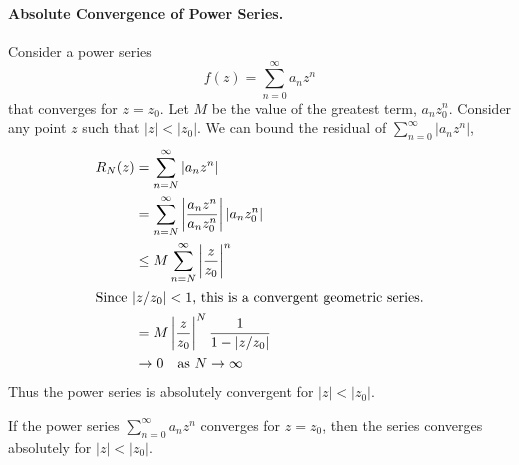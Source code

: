 \paragraph{Absolute Convergence of Power Series.}
Consider a power series
\[ 
f(z) = \sum_{n = 0}^\infty a_n z^n 
\]
that converges for $z = z_0$.  Let $M$ be the value of the greatest term,
$a_n z_0^n$.  Consider any point $z$ such that $|z| < |z_0|$.
We can bound the residual of $\sum_{n = 0}^\infty |a_n z^n|$, 
\begin{align*}
  R_N(z)  &= \sum_{n=N}^\infty |a_n z^n| 
  \\
  &= \sum_{n=N}^\infty \left| \frac{a_n z^n}{a_n z_0^n} \right|  |a_n z_0^n| 
  \\
  &\leq M \sum_{n=N}^\infty \left|\frac{z}{z_0} \right|^n 
  \\
  \intertext{Since $|z / z_0| < 1$, this is a convergent geometric series.}
  &= M \left|\frac{z}{z_0}\right|^N \frac{1}{1 - |z/z_0|} 
  \\
  &\to 0 \quad \mathrm{as}\ N \to \infty
\end{align*}
Thus the power series is absolutely convergent for $|z| < |z_0|$. 



\begin{Result}
  If the power series $\sum_{n = 0}^\infty a_n z^n$ converges for $z = z_0$, then
  the series converges absolutely for $|z| < |z_0|$.
\end{Result}









